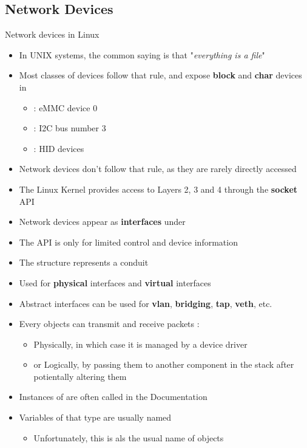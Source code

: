 \subsection{Network Devices}

\begin{frame}{Network devices in Linux}
	\begin{itemize}
		\item In UNIX systems, the common saying is that "\textit{everything is a file}"
		\item Most classes of devices follow that rule, and expose \textbf{block} and \textbf{char} devices in 
			\begin{itemize}
				\item {} : eMMC device 0
				\item {} : I2C bus number 3
				\item {} : HID devices
			\end{itemize}
		\item Network devices don't follow that rule, as they are rarely directly accessed
		\item The Linux Kernel provides access to Layers 2, 3 and 4 through the \textbf{socket} API
		\item Network devices appear as \textbf{interfaces} under 
		\item The  API is only for limited control and device information
	\end{itemize}
\end{frame}

\begin{frame}{}
	\begin{itemize}
		\item The  structure represents a conduit
		\item Used for \textbf{physical} interfaces and \textbf{virtual} interfaces
		\item Abstract interfaces can be used for \textbf{vlan}, \textbf{bridging}, \textbf{tap}, \textbf{veth}, etc.
		\item Every  objects can transmit and receive packets :
			\begin{itemize}
				\item Physically, in which case it is managed by a device driver
				\item or Logically, by passing them to another component in the stack after potientally altering them
			\end{itemize}
		\item Instances of  are often called  in the Documentation
		\item Variables of that type are usually named 
			\begin{itemize}
				\item Unfortunately, this is als the usual name of  objects
			\end{itemize}
	\end{itemize}
\end{frame}


